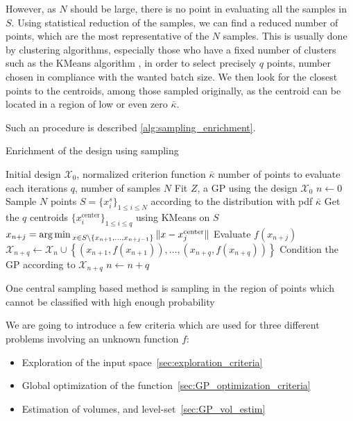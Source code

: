 \documentclass[../../Main_ManuscritThese.tex]{subfiles}
\begin{document}
However, as $N$ should be large, there is no point in evaluating all the samples in $S$. Using statistical reduction of the samples, we can find a reduced number of points, which are the most representative of the $N$ samples. This is usually done by clustering algorithms, especially those who have a fixed number of clusters such as the KMeans algorithm \cite{macqueen_methods_1967}, in order to select precisely $q$ points, number chosen in compliance with the wanted batch size. We then look for the closest points to the centroids, among those sampled originally, as the centroid can be located in a region of low or even zero $\bar{\kappa}$.

Such an procedure is described \cref{alg:sampling_enrichment}.
\begin{algorithm}
  \caption{Enrichment of the design using sampling}
  \label{alg:sampling_enrichment}
\begin{algorithmic}
  \REQUIRE Initial design $\mathcal{X}_0$, normalized criterion function $\bar{\kappa}$
  \REQUIRE number of points to evaluate each iterations $q$, number of samples $N$
\STATE Fit $Z$, a GP using the design $\mathcal{X}_0$
\STATE $n \leftarrow 0$
\STATE Sample $N$ points $S = \{x^s_i\}_{1 \leq i \leq N}$ according to the distribution with pdf $\bar{\kappa}$
\STATE Get the $q$ centroids $\{x_i^{\mathrm{center}}\}_{1 \leq i \leq q}$ using KMeans on $S$
\STATE $x_{n+j}=\operatorname*{arg\,min \,}_{x \in S \setminus \{x_{n+1}, \dots, x_{n+j-1}\}} \|x - x_j^{\mathrm{center}} \|$
\ENDFOR
\STATE Evaluate $f(x_{n+j})$
\STATE $\mathcal{X}_{n+q} \leftarrow \mathcal{X}_n \cup \left\{\left(x_{n+1}, f(x_{n+1})\right),\dots,  \left(x_{n+q}, f(x_{n+q})\right)\right\}$
\STATE Condition the GP according to $\mathcal{X}_{n+q}$
\STATE $n \leftarrow n + q$
\ENDWHILE
\end{algorithmic}
\end{algorithm}
One central sampling based method is sampling in the region of points which cannot be classified with high enough probability

We are going to introduce a few criteria which are used for three different problems involving an unknown function $f$:
\begin{itemize}
\item Exploration of the input space~\cref{sec:exploration_criteria}
\item Global optimization of the function~\cref{sec:GP_optimization_criteria}
\item Estimation of volumes, and level-set~\cref{sec:GP_vol_estim} 
\end{itemize}
\end{document}

